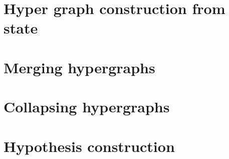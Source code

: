 \documentclass[..\Master.tex]{subfiles}
\providecommand{\master}{..}
\begin{document}
\section{Hyper graph construction from state}
	

\section{Merging hypergraphs}\label{sec:C:HGMerging}
    

\section{Collapsing hypergraphs}
	

\section{Hypothesis construction}
	
\end{document}

